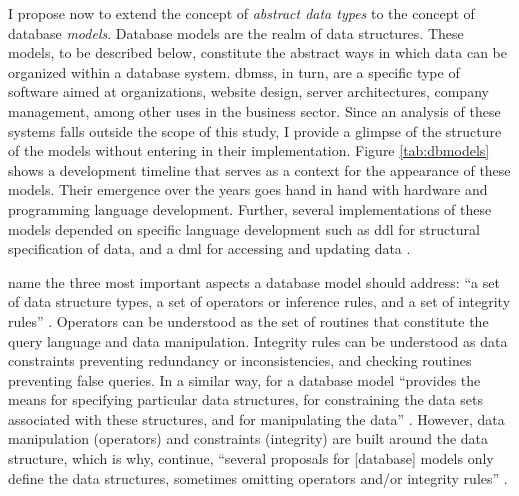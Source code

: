 I propose now to extend the concept of \textit{abstract data types} to the concept of database \textit{models}. Database models are the realm of data structures. These models, to be described below, constitute the abstract ways in which data can be organized within a database system. \gls{dbms}s, in turn, are a specific type of software aimed at organizations, website design, server architectures, company management, among other uses in the business sector. Since an analysis of these systems falls outside the scope of this study, I provide a glimpse of the structure of the models without entering in their implementation. Figure \ref{tab:dbmodels} shows a development timeline that serves as a context for the appearance of these models. Their emergence over the years goes hand in hand with hardware and programming language development. Further, several implementations of these models depended on specific language development such as \gls{ddl} for structural specification of data, and a \gls{dml} for accessing and updating data \parencite[4]{DBLP:books/aw/AbiteboulHV95}. 

\textcite{2008:graph/anglesgutierrez/survey} name the three most important aspects a database model should address: ``a set of data structure types, a set of operators or inference rules, and a set of integrity rules'' \parencite[2]{2008:graph/anglesgutierrez/survey}. Operators can be understood as the set of routines that constitute the query language and data manipulation. Integrity rules can be understood as data constraints preventing redundancy or inconsistencies, and checking routines preventing false queries. In a similar way, for \textcite{DBLP:books/aw/AbiteboulHV95} a database model ``provides the means for specifying particular data structures, for constraining the data sets associated with these structures, and for manipulating the data'' \parencite[28]{DBLP:books/aw/AbiteboulHV95}. However, data manipulation (operators) and constraints (integrity) are built around the data structure, which is why, \textcite{2008:graph/anglesgutierrez/survey} continue, ``several proposals for [database] models only define the data structures, sometimes omitting operators and/or integrity rules'' \parencite[2]{2008:graph/anglesgutierrez/survey}. 

